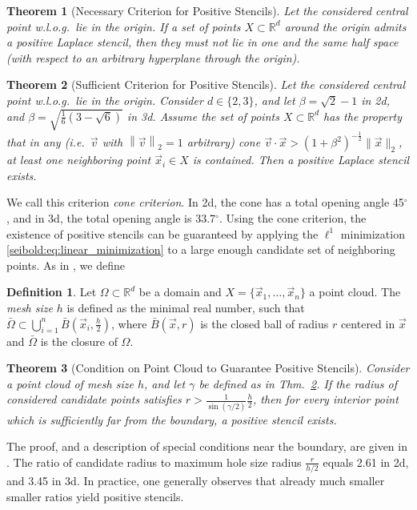 \documentclass[reqno]{amsart}
\theoremstyle{plain}
\newtheorem{thm}{Theorem}
\theoremstyle{definition}
\newtheorem{defn}{Definition}
\theoremstyle{remark}
\begin{document}
\begin{thm}[Necessary Criterion for Positive Stencils]
\label{seibold:thm:mps_pos_stencil_necessary}
Let the considered central point w.l.o.g.~lie in the origin.
If a set of points $X\subset\mathbb{R}^d$ around the origin admits a positive
Laplace stencil, then they must not lie in one and the same half space (with
respect to an arbitrary hyperplane through the origin).
\end{thm}
\begin{thm}[Sufficient Criterion for Positive Stencils]
\label{seibold:thm:mps_pos_stencil_sufficient}
Let the considered central point w.l.o.g.~lie in the origin. Consider $d\in\{2,3\}$,
and let $\beta=\sqrt{2}-1$ in 2d, and $\beta=\sqrt{\frac{1}{6}(3-\sqrt{6})}$ in 3d.
Assume the set of points $X\subset\mathbb{R}^d$ has the property that in any
(i.e.~$\vec{v}$ with ${\left\|{\vec{v}}\right\|}_2=1$ arbitrary) cone
$\vec{v}\cdot\vec{x}>{\left({1+\beta^2}\right)}^{-\frac{1}{2}}\|\vec{x}\|_2$,
at least one neighboring point $\vec{x}_i\in X$ is contained.
Then a positive Laplace stencil exists.
\end{thm}
We call this criterion \emph{cone criterion}.
In 2d, the cone has a total opening angle 45\ensuremath{^\circ}, and in 3d,
the total opening angle is 33.7\ensuremath{^\circ}.
Using the cone criterion, the existence of positive stencils can be guaranteed by
applying the $\ell^1$ minimization \eqref{seibold:eq:linear_minimization} to a
large enough candidate set of neighboring points.
As in \cite{Levin1998}, we define
\begin{defn}
\label{seibold:def:mesh_size}
Let $\Omega\subset\mathbb{R}^d$ be a domain and $X=\{\vec{x}_1,\dots,\vec{x}_n\}$
a point cloud. The \emph{mesh size} $h$ is defined as the minimal real number, such
that $\bar\Omega\subset \bigcup_{i=1}^n \bar B{\left({\vec{x}_i,\frac{h}{2}}\right)}$,
where $\bar B{\left({\vec{x},r}\right)}$ is the closed ball of radius $r$ centered in $\vec{x}$
and $\bar\Omega$ is the closure of $\Omega$.
\end{defn}
\begin{thm}[Condition on Point Cloud to Guarantee Positive Stencils]
\label{seibold:thm:pos_stencil_mesh_size}
Consider a point cloud of mesh size $h$, and let $\gamma$ be defined as in
Thm.~\ref{seibold:thm:mps_pos_stencil_sufficient}. If the radius of
considered candidate points satisfies $r > \frac{1}{\sin(\gamma/2)}\frac{h}{2}$,
then for every interior point which is sufficiently far from the boundary, a positive
stencil exists.
\end{thm}
The proof, and a description of special conditions near the boundary, are given
in \cite{Seibold2008}. The ratio of candidate radius to maximum hole size radius
$\frac{r}{h/2}$ equals 2.61 in 2d, and 3.45 in 3d.
In practice, one generally observes that already much smaller smaller ratios yield
positive stencils.
\end{document}
